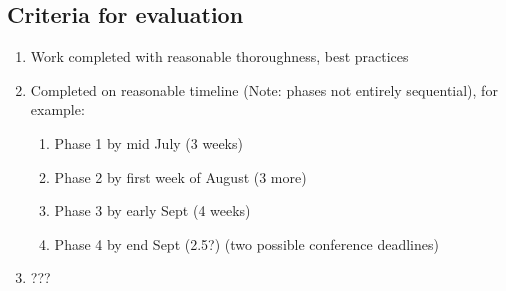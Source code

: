 \documentclass[12pt, twocolumn]{article}
\begin{document}
\subsection{Criteria for evaluation}
\begin{enumerate}
	\item Work completed with reasonable thoroughness, best practices
	\item Completed on reasonable timeline (Note: phases not entirely sequential), for example:
	\begin{enumerate}
		\item Phase 1 by mid July (3 weeks)
		\item Phase 2 by first week of August (3 more)
		\item Phase 3 by early Sept (4 weeks)
		\item Phase 4 by end Sept (2.5?) (two possible conference deadlines)
	\end{enumerate}
	\item ???
\end{enumerate}
\end{document}
